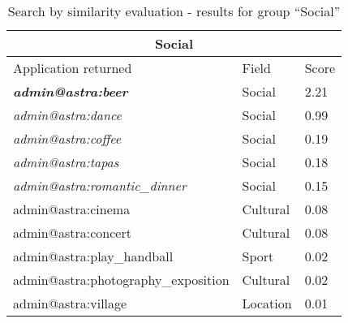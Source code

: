 \begin{table}[h!]
	\tiny
    \begin{center}
		\begin{tabular}{||l|l|l||}

		\hline \hline
		\multicolumn{3}{||c||}{\bfseries{Social}} \\
		\hline \hline
			Application returned & Field & Score \\
			\hline \hline
			\textit{\textbf{admin@astra:beer}}	&	Social	&	2.21	\\
			\hline
			\textit{admin@astra:dance}	&	Social	&	0.99	\\
			\hline
			\textit{admin@astra:coffee}	&	Social	&	0.19	\\
			\hline
			\textit{admin@astra:tapas}	&	Social	&	0.18	\\
			\hline
			\textit{admin@astra:romantic\_dinner}	&	Social	&	0.15	\\
			\hline
			admin@astra:cinema	&	Cultural	&	0.08	\\
			\hline
			admin@astra:concert	&	Cultural	&	0.08	\\
			\hline			
			admin@astra:play\_handball	&	Sport	&	0.02	\\
			\hline
			admin@astra:photography\_exposition	&	Cultural	&	0.02	\\
			\hline
			admin@astra:village	&	Location	&	0.01	\\

		\hline \hline

		\end{tabular}
		\caption{\label{table:testing-results-social}Search by similarity evaluation
		- results for group ``Social''}
	\end{center}
\end{table} 


